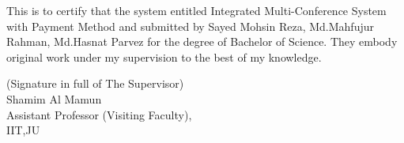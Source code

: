 
This is to certify that the system entitled Integrated Multi-Conference System with Payment Method and submitted by Sayed Mohsin Reza, Md.Mahfujur Rahman, Md.Hasnat Parvez for the degree of Bachelor of Science. They embody original work under my supervision to the best of my knowledge.


\bigskip
\bigskip
\bigskip

\noindent (Signature in full of
The Supervisor)
 \\
  Shamim Al Mamun \\ Assistant Professor (Visiting Faculty),  \\
  IIT,JU\\

